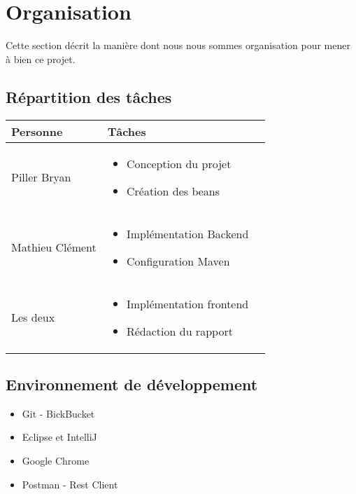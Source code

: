 \section{Organisation}

Cette section décrit la manière dont nous nous sommes organisation pour mener à bien ce projet.

\subsection{Répartition des tâches}

\begin{tabular}{|l|p{7cm}|l|}
\hline
Personne & Tâches \\
\hline

Piller Bryan & 
\begin{itemize}
  \item Conception du projet
  \item Création des beans
\end{itemize}\\
\hline

Mathieu Clément & 
\begin{itemize}
  \item Implémentation Backend
  \item Configuration Maven   
\end{itemize}\\
\hline

Les deux &
\begin{itemize}
  \item Implémentation frontend
  \item Rédaction du rapport
\end{itemize}\\
\hline

\end{tabular}

\subsection{Environnement de développement}
\begin{itemize}
\item Git - BickBucket
\item Eclipse et IntelliJ
\item Google Chrome
\item Postman - Rest Client
\end{itemize}


